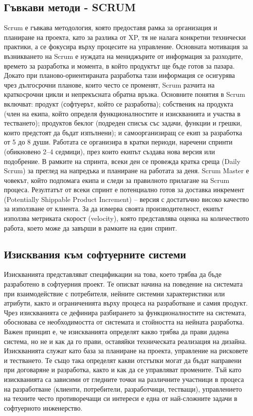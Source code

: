 \documentclass{article}
\renewcommand{\\}{\newline}
\begin{document}
\subsection{Гъвкави методи - SCRUM}
Scrum е гъвкава методология, която предоставя рамка за организация и планиране на проекта, като за разлика от XP, тя не налага конкретни технически практики, а се фокусира върху процесите на управление. Основната мотивация за възникването на Scrum е нуждата на мениджърите от информация за разходите, времето за разработка и момента, в който продуктът ще бъде готов за пазара. Докато при планово-ориентираната разработка тази информация се осигурява чрез дългосрочни планове, които често се променят, Scrum разчита на краткосрочни цикли и непрекъсната обратна връзка. Основните понятия в Scrum включват: продукт (софтуерът, който се разработва); собственик на продукта (член на екипа, който определя функционалностите и изискванията и участва в тестването); продуктов беклог (подреден списък със задачи, функции и грешки, които предстоят да бъдат изпълнени); и самоорганизиращ се екип за разработка от 5 до 8 души. Работата се организира в кратки периоди, наречени спринти (обикновено 2–4 седмици), през които екипът създава нова версия или подобрение. В рамките на спринта, всеки ден се провежда кратка среща (Daily Scrum) за преглед на напредъка и планиране на работата за деня. Scrum Master е човекът, който подпомага екипа и следи за правилното прилагане на Scrum процеса. Резултатът от всеки спринт е потенциално готов за доставка инкремент (Potentially Shippable Product Increment) – версия с достатъчно високо качество за използване от клиента. За да измерва своята производителност, екипът използва метриката скорост (velocity), която представлява оценка на количеството работа, което може да завърши в рамките на един спринт.

\subsection{Изисквания към софтуерните системи}
Изискванията представляват спецификации на това, което трябва да бъде разработено в софтуерния проект. Те описват начина на поведение на системата при взаимодействие с потребителя, нейните системни характеристики или атрибути, както и ограниченията върху процеса на разработване и самия продукт. Чрез изискванията се дефинира разбирането за функционалностите на системата, обосновава се необходимостта от системата и стойността на нейната разработка. Важен принцип е, че изискванията определят какво трябва да прави дадена система, но не и как да го прави, оставяйки техническата реализация на дизайна. Изискванията служат като база за планиране на проекта, управление на рисковете и тестването. Те също така определят какви отстъпки могат да бъдат направени при договаряне и разработка, както и как да се управляват промените. Тъй като изискванията са зависими от гледните точки на различните участници в процеса на разработване (клиенти, потребители, разработчици, тестващи), управлението на техните често противоречащи си интереси е една от най-сложните задачи в софтуерното инженерство.
\end{document}
